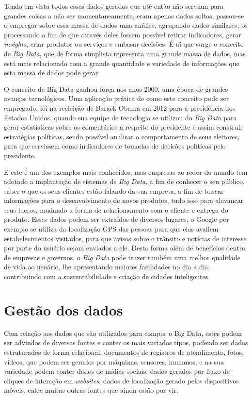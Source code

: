 Tendo em vista todos esses dados gerados que até então não serviam para grandes coisas a não ser momentaneamente, eram apenas dados soltos, passou-se a empregar sobre essa massa de dados uma análise, agrupando dados similares, os processando a fim de que através deles fossem possível retirar indicadores, gerar \textit{insights}, criar produtos ou serviços e embasar decisões. É aí que surge o conceito de \textit{Big Data}, que de forma simplista representa uma grande massa de dados, mas está mais relacionado com a grande quantidade e variedade de informações que esta massa de dados pode gerar.~\cite{navegg}

O conceito de Big Data ganhou força nos anos 2000, uma época de grandes avanços tecnológicos. Uma aplicação prática de como este conceito pode ser empregado, foi na reeleição de Barack Obama em 2012 para a presidência dos Estados Unidos, quando sua equipe de tecnologia se utilizou do \textit{Big Data} para gerar estatísticas sobre os comentários a respeito do presidente e assim construir estratégias políticas, sendo possível analisar o comportamento de seus eleitores, para que servissem como indicadores de tomadas de decisões políticas pelo presidente.~\cite{sinha2014making}

E este é um dos exemplos mais conhecidos, mas empresas ao redor do mundo tem adotado a implantação de sistemas de \textit{Big Data}, a fim de conhecer o seu público, saber o que os seus clientes estão falando da sua empresa, a fim de buscar informações para o desenvolvimento de novos produtos, tudo isso para alavancar seus lucros, mudando a forma de relacionamento com o cliente e entrega do produto. Esses dados podem ser extraídos de diversos lugares, o Google por exemplo se utiliza da localização GPS das pessoas para que elas avaliem estabelecimentos visitados, para que avisos sobre o trânsito e notícias de interesse por parte do usuário sejam enviados a ele. Desta forma além de benefícios dentro de empresas e governos, o \textit{Big Data} pode trazer também uma melhor qualidade de vida ao usuário, lhe apresentando maiores facilidades no dia a dia, contribuindo com a sustentabilidade e criação de cidades inteligentes.~\cite{navegg}

\section{Gestão dos dados}
\label{sec:gestaodados}
Com relação aos dados que são utilizados para compor o Big Data, estes podem ser advindos de diversas fontes e conter os mais variados tipos, podendo ser dados estruturados de forma relacional, documentos de registros de atendimento, fotos, vídeos, que podem ser gerados por máquinas, sensores, humanos, e na sua variedade podem conter dados de mídias sociais, dados gerados por fluxo de cliques de interação em \textit{websites}, dados de localização gerado pelos dispositivos móveis, entre muitas outras fontes que ainda estão por vir.~\cite{leigos}

